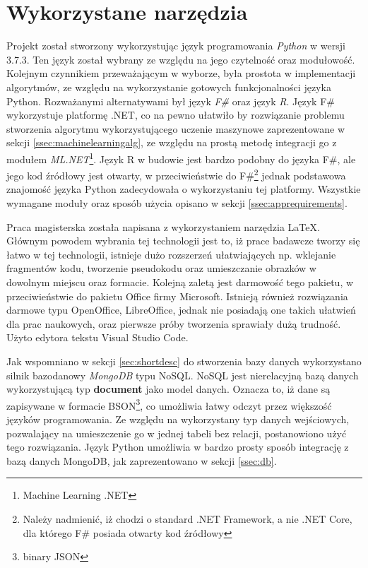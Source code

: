 \section{Wykorzystane narzędzia}
\label{sec:tools}
Projekt został stworzony wykorzystując język programowania \emph{Python} \cite{Python} w wersji 3.7.3. Ten język został wybrany ze względu na jego czytelność oraz modułowość. Kolejnym czynnikiem przeważającym w wyborze, była prostota w implementacji algorytmów, ze względu na wykorzystanie gotowych funkcjonalności języka Python. Rozważanymi alternatywami był język \emph{F\#} oraz język \emph{R}. Język F\# wykorzystuje platformę .NET, co na pewno ułatwiło by rozwiązanie problemu stworzenia algorytmu wykorzystującego uczenie maszynowe zaprezentowane w sekcji \ref{ssec:machinelearningalg}, ze względu na prostą metodę integracji go z modułem \emph{ML.NET}\footnote{Machine Learning .NET}. Język R w budowie jest bardzo podobny do języka F\#, ale jego kod źródłowy jest otwarty, w przeciwieństwie do F\#\footnote{Należy nadmienić, iż chodzi o standard .NET Framework, a nie .NET Core, dla którego F\# posiada otwarty kod źródłowy} jednak podstawowa znajomość języka Python zadecydowała o wykorzystaniu tej platformy. Wszystkie wymagane moduły oraz sposób użycia opisano w sekcji \ref{ssec:apprequirements}.\par
Praca magisterska została napisana z wykorzystaniem narzędzia \LaTeX\cite{Latex}. Głównym powodem wybrania tej technologii jest to, iż prace badawcze tworzy się łatwo w tej technologii, istnieje dużo rozszerzeń ułatwiających np. wklejanie fragmentów kodu, tworzenie pseudokodu oraz umieszczanie obrazków w dowolnym miejscu oraz formacie. Kolejną zaletą jest darmowość tego pakietu, w przeciwieństwie do pakietu Office firmy Microsoft. Istnieją również rozwiązania darmowe typu OpenOffice, LibreOffice, jednak nie posiadają one takich ułatwień dla prac naukowych, oraz pierwsze próby tworzenia sprawiały dużą trudność. Użyto edytora tekstu Visual Studio Code.\par
Jak wspomniano w sekcji \ref{sec:shortdesc} do stworzenia bazy danych wykorzystano silnik bazodanowy \emph{MongoDB} typu NoSQL. NoSQL jest nierelacyjną bazą danych wykorzystującą typ \textbf{document} jako model danych. Oznacza to, iż dane są zapisywane w formacie BSON\footnote{binary JSON}, co umożliwia łatwy odczyt przez większość języków programowania. Ze względu na wykorzystany typ danych wejściowych, pozwalający na umieszczenie go w jednej tabeli bez relacji, postanowiono użyć tego rozwiązania. Język Python umożliwia w bardzo prosty sposób integrację z bazą danych MongoDB, jak zaprezentowano w sekcji \ref{ssec:db}.
